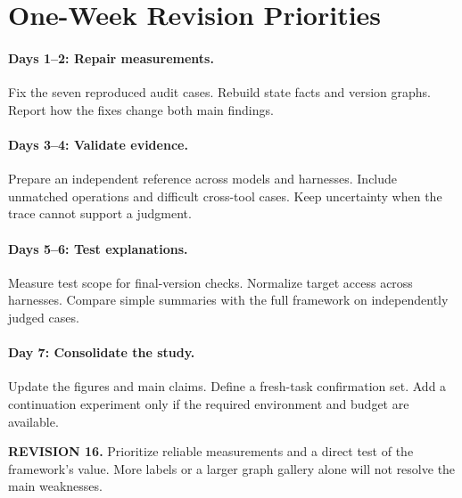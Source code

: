 \documentclass[10pt,a4paper,twocolumn]{article}
\newcommand{\rev}[2]{\par\smallskip\noindent\begin{minipage}{\linewidth}\color{revision}\footnotesize\textbf{REVISION #1.} #2\end{minipage}\par\smallskip}
\begin{document}
\section{One-Week Revision Priorities}
\paragraph{Days 1--2: Repair measurements.}
Fix the seven reproduced audit cases. Rebuild state facts and version graphs. Report how the fixes change both main findings.
\paragraph{Days 3--4: Validate evidence.}
Prepare an independent reference across models and harnesses. Include unmatched operations and difficult cross-tool cases. Keep uncertainty when the trace cannot support a judgment.
\paragraph{Days 5--6: Test explanations.}
Measure test scope for final-version checks. Normalize target access across harnesses. Compare simple summaries with the full framework on independently judged cases.
\paragraph{Day 7: Consolidate the study.}
Update the figures and main claims. Define a fresh-task confirmation set. Add a continuation experiment only if the required environment and budget are available.
\rev{16}{Prioritize reliable measurements and a direct test of the framework's value. More labels or a larger graph gallery alone will not resolve the main weaknesses.}
\end{document}
